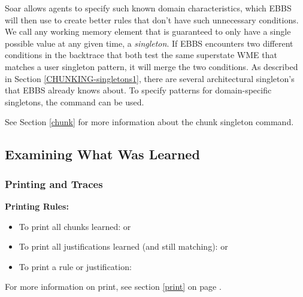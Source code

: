 Soar allows agents to specify such known domain characteristics, which EBBS will then use to create better rules that don't have such unnecessary conditions.  We call any working memory element that is guaranteed to only have a single possible value at any given time, a \textit{singleton}.  If EBBS encounters two different conditions in the backtrace that both test the same superstate WME that matches a user singleton pattern, it will merge the two conditions. As described in Section \ref{CHUNKING-singletons1}, there are several architectural singleton's that EBBS already knows about.  To specify patterns for domain-specific singletons, the  command can be used.

See Section \ref{chunk} for more information about the chunk singleton command.

\subsection{Examining What Was Learned}

\subsubsection{Printing and Traces}

\textbf{Printing Rules:}
\begin{itemize}
	\item To print all chunks learned: \newline  {} or 
	\item To print all justifications learned (and still matching):  \newline {} or 
	\item To print a rule or justification: \newline  {}
\end{itemize}

For more information on print, see section \ref{print} on page \pageref{print}.

